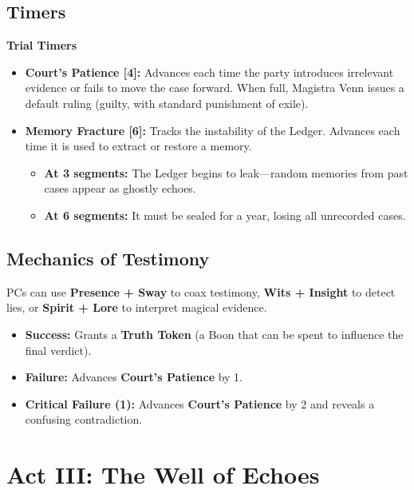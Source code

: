 \documentclass[12pt]{book}
\begin{document}
\section{Timers}

\begin{infobox}
\textbf{Trial Timers}
\begin{itemize}
    \item \textbf{Court's Patience [4]:} Advances each time the party introduces irrelevant evidence or fails to move the case forward. When full, Magistra Venn issues a default ruling (guilty, with standard punishment of exile).
    \item \textbf{Memory Fracture [6]:} Tracks the instability of the Ledger. Advances each time it is used to extract or restore a memory.
    \begin{itemize}
        \item \textbf{At 3 segments:} The Ledger begins to leak---random memories from past cases appear as ghostly echoes.
        \item \textbf{At 6 segments:} It must be sealed for a year, losing all unrecorded cases.
    \end{itemize}
\end{itemize}
\end{infobox}

\section{Mechanics of Testimony}

PCs can use \textbf{Presence + Sway} to coax testimony, \textbf{Wits + Insight} to detect lies, or \textbf{Spirit + Lore} to interpret magical evidence.

\begin{itemize}
    \item \textbf{Success:} Grants a \textbf{Truth Token} (a Boon that can be spent to influence the final verdict).
    \item \textbf{Failure:} Advances \textbf{Court's Patience} by 1.
    \item \textbf{Critical Failure (1):} Advances \textbf{Court's Patience} by 2 and reveals a confusing contradiction.
\end{itemize}

\chapter{Act III: The Well of Echoes}
\end{document}
